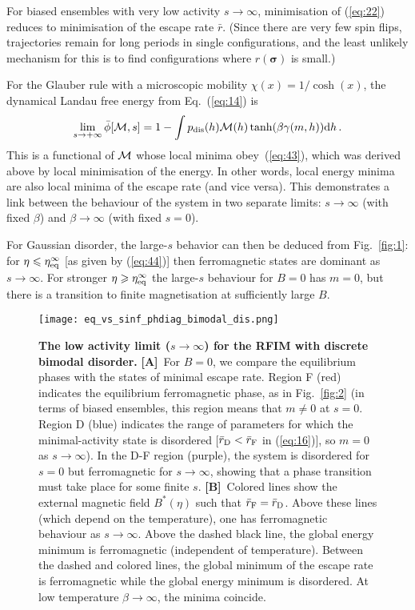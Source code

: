 \documentclass{iopart}
\newcommand{\eqref}[1]{(\ref{#1})}
\newcommand{\dst}[0]{\ensuremath{\mathrm{d}}}
\begin{document}
For biased ensembles with very low activity $s\to\infty$, minimisation of \eqref{eq:22} reduces to minimisation of the escape rate $\bar{r}$.  (Since there are very few spin flips, trajectories remain for long periods in single configurations, and the least unlikely mechanism for this is to find configurations where $r(\bm{\sigma})$ is small.)

For the Glauber rule with a microscopic mobility $\chi(x) = 1/\cosh(x)$, the dynamical Landau free energy from Eq.~\eqref{eq:14} is
\begin{equation}
  \label{eq:47}
  \lim_{s\to +\infty} \bar{\phi}[\mm, s] = 1 - \int \pdis(h) \mm(h) \tanh(\beta \gamma(m,h)) \dst h\, .
\end{equation}
This is a functional of ${\cal M}$ whose local minima obey~\eqref{eq:43}, which was derived above by local minimisation of the energy.  
In other words, local energy minima are also local minima of the escape rate (and vice versa).
This demonstrates a link between the behaviour of the system in two separate limits: $s\to \infty$ (with fixed $\beta$) and $\beta\to \infty$ (with fixed $s=0$).

For Gaussian disorder, the large-$s$ behavior can then be deduced from Fig.~\ref{fig:1}: 
for $\eta \leqslant \eta^\infty_{\rm eq}$ [as given by (\ref{eq:44})] then ferromagnetic states are dominant as $s\to\infty$.  For stronger $\eta \geqslant \eta^\infty_{\rm eq}$ the large-$s$ behaviour for $B=0$ has $m=0$, but there is a transition to finite magnetisation at sufficiently large $B$.


\begin{figure}
  \centering
  \texttt{[image: eq\_vs\_sinf\_phdiag\_bimodal\_dis.png]}
  \caption{\textbf{The low activity limit ($s\to \infty$) for the RFIM with discrete bimodal disorder.} 
  \textbf{[A]}~For $B=0$, we compare the equilibrium phases with the states of minimal escape rate.  Region F (red) indicates the equilibrium ferromagnetic phase, as in Fig.~\ref{fig:2} (in terms of biased ensembles, this region means that $m\neq0$ at $s=0$.  Region D (blue) indicates the range of parameters for which the minimal-activity state is disordered [$\bar{r}_{\rm D}<\bar{r}_{\rm F}$ in (\ref{eq:16})], so $m=0$ as $s\to\infty$).  In the D-F region (purple), the system is disordered for $s=0$ but ferromagnetic for $s\to\infty$, showing that a phase transition must take place for some finite $s$.  
\textbf{[B]}~Colored lines show the external magnetic field $B^{\ast}(\eta)$ such that $\bar{r}_{\rm F}=\bar{r}_{\rm D}$.  Above these lines (which depend on the temperature), one has ferromagnetic behaviour as $s\to\infty$.  Above the dashed black line, the global energy minimum is ferromagnetic (independent of temperature).  Between the dashed and colored lines, the global minimum of the escape rate is ferromagnetic while the global energy minimum is disordered.  At low temperature $\beta\to\infty$, the minima coincide.}
  \label{fig:3}
\end{figure}
\end{document}
